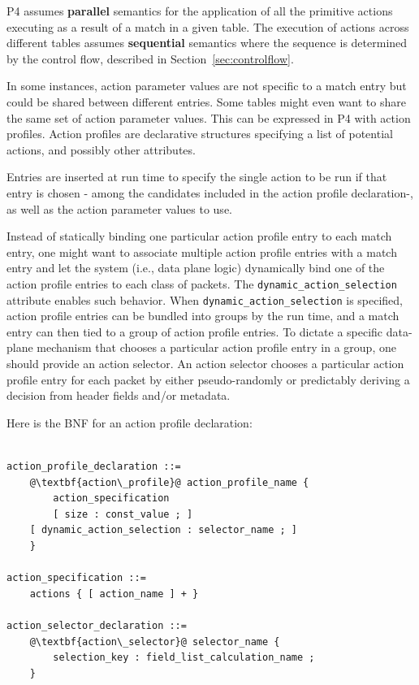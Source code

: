 \documentclass[12pt]{article}
\begin{document}
P4 assumes \textbf{parallel} semantics for the application of all the primitive actions 
executing as a result of a match in a given table. The execution of actions 
across different tables assumes \textbf{sequential} semantics where the sequence is 
determined by the control flow, described in Section~\ref{sec:controlflow}.



In some instances, action parameter values are not specific to a match entry but
could be shared between different entries. Some tables might even want to share
the same set of action parameter values. This can be expressed in P4 with
action profiles.
Action profiles are declarative structures specifying a list of potential
actions, and possibly other attributes.

Entries are inserted at run time to specify the single action to be run if that
entry is chosen - among the candidates included in the action profile
declaration-, as well as the action parameter values to use.

Instead of statically binding one particular action profile entry to each match
entry, one might want to associate multiple action profile entries with a match
entry and let the system (i.e., data plane logic) dynamically bind one of the
action profile entries to each class of packets. The
\texttt{dynamic_action_selection} attribute enables such behavior. When
\texttt{dynamic_action_selection} is specified, action profile entries can be
bundled into groups by the run time, and a match entry can then tied to a group
of action profile entries. To dictate a specific data-plane mechanism that
chooses a particular action profile entry in a group, one should provide an
action selector. An action selector chooses a particular action profile entry
for each packet by either pseudo-randomly or predictably deriving a decision
from header fields and/or metadata.

Here is the BNF for an action profile declaration:

\begin{lstlisting}[frame=single,backgroundcolor=\color{bnfgreen},escapechar=\@]

action_profile_declaration ::=
    @\textbf{action\_profile}@ action_profile_name {
        action_specification
        [ size : const_value ; ]
	[ dynamic_action_selection : selector_name ; ]
    }

action_specification ::= 
    actions { [ action_name ] + }

action_selector_declaration ::=
    @\textbf{action\_selector}@ selector_name {
        selection_key : field_list_calculation_name ;
    }

\end{lstlisting}
\end{document}
